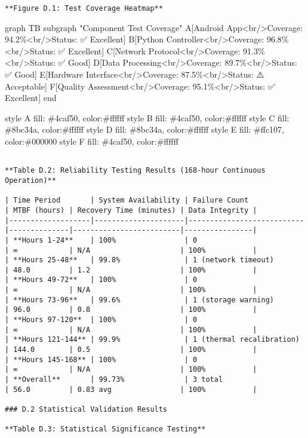 \documentclass[11pt,a4paper]{report}
\begin{document}
\begin{verbatim}
**Figure D.1: Test Coverage Heatmap**

\end{verbatim}
graph TB
subgraph "Component Test Coverage"
A[Android App<br/>Coverage: 94.2\%<br/>Status: ✅ Excellent]
B[Python Controller<br/>Coverage: 96.8\%<br/>Status: ✅ Excellent]
C[Network Protocol<br/>Coverage: 91.3\%<br/>Status: ✅ Good]
D[Data Processing<br/>Coverage: 89.7\%<br/>Status: ✅ Good]
E[Hardware Interface<br/>Coverage: 87.5\%<br/>Status: ⚠️ Acceptable]
F[Quality Assessment<br/>Coverage: 95.1\%<br/>Status: ✅ Excellent]
end

style A fill: \#4caf50, color:\#ffffff
style B fill: \#4caf50, color:\#ffffff
style C fill: \#8bc34a, color:\#ffffff
style D fill: \#8bc34a, color:\#ffffff
style E fill: \#ffc107, color:\#000000
style F fill: \#4caf50, color:\#ffffff
\begin{verbatim}

**Table D.2: Reliability Testing Results (168-hour Continuous Operation)**

| Time Period       | System Availability | Failure Count             | MTBF (hours) | Recovery Time (minutes) | Data Integrity |
|-------------------|---------------------|---------------------------|--------------|-------------------------|----------------|
| **Hours 1-24**    | 100%                | 0                         | ∞            | N/A                     | 100%           |
| **Hours 25-48**   | 99.8%               | 1 (network timeout)       | 48.0         | 1.2                     | 100%           |
| **Hours 49-72**   | 100%                | 0                         | ∞            | N/A                     | 100%           |
| **Hours 73-96**   | 99.6%               | 1 (storage warning)       | 96.0         | 0.8                     | 100%           |
| **Hours 97-120**  | 100%                | 0                         | ∞            | N/A                     | 100%           |
| **Hours 121-144** | 99.9%               | 1 (thermal recalibration) | 144.0        | 0.5                     | 100%           |
| **Hours 145-168** | 100%                | 0                         | ∞            | N/A                     | 100%           |
| **Overall**       | 99.73%              | 3 total                   | 56.0         | 0.83 avg                | 100%           |

### D.2 Statistical Validation Results

**Table D.3: Statistical Significance Testing**


\end{verbatim}
\end{document}
